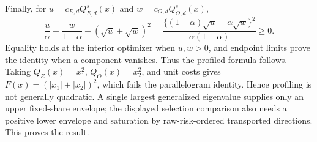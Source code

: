 Finally, for \(u=c_{E,d}Q_{E,d}^{s}(x)\) and \(w=c_{O,d}Q_{O,d}^{s}(x)\),
\[
 \frac{u}{\alpha}+\frac{w}{1-\alpha}-(\sqrt u+\sqrt w)^2
 =\frac{\{(1-\alpha)\sqrt u-\alpha\sqrt w\}^{2}}
 {\alpha(1-\alpha)}\ge0.
\]
Equality holds at the interior optimizer when \(u,w>0\), and endpoint limits prove the identity when a component vanishes.  Thus the profiled formula follows.  Taking \(Q_E(x)=x_1^2\), \(Q_O(x)=x_2^2\), and unit costs gives \(F(x)=(|x_1|+|x_2|)^2\), which fails the parallelogram identity.  Hence profiling is not generally quadratic.  A single largest generalized eigenvalue supplies only an upper fixed-share envelope; the displayed selection comparison also needs a positive lower envelope and saturation by raw-risk-ordered transported directions.  This proves the result.